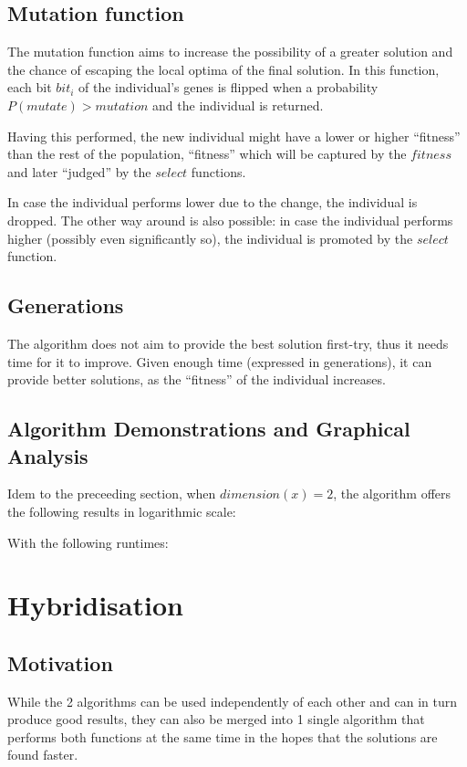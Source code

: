 \documentclass[conference]{IEEEtran}
\begin{document}
\subsection{Mutation function}
The mutation function aims to increase the possibility of a greater solution and the chance of escaping
the local optima of the final solution. In this function, each bit $bit_i$ of the individual's genes
is flipped when a probability $P(mutate) > mutation$ and the individual is returned.

Having this performed, the new individual might have a lower or higher ``fitness'' than the rest of the population,
``fitness'' which will be captured by the $fitness$ and later ``judged'' by the $select$ functions.

In case the individual performs lower due to the change, the individual is dropped. The other way around is also possible:
in case the individual performs higher (possibly even significantly so), the individual is promoted by the $select$ function.

\subsection{Generations}
The algorithm does not aim to provide the best solution first-try, thus it needs time for it to improve. Given enough time
(expressed in generations), it can provide better solutions, as the ``fitness'' of the individual increases.

\subsection{Algorithm Demonstrations and Graphical Analysis}

Idem to the preceeding section, when $dimension(x) = 2$, the algorithm offers
the following results in logarithmic scale:


With the following runtimes:


\section{Hybridisation}

\subsection{Motivation}
While the 2 algorithms can be used independently of each other and can in turn produce good results, they can also be
merged into 1 single algorithm that performs both functions at the same time in the hopes that the solutions are found faster.
\end{document}
